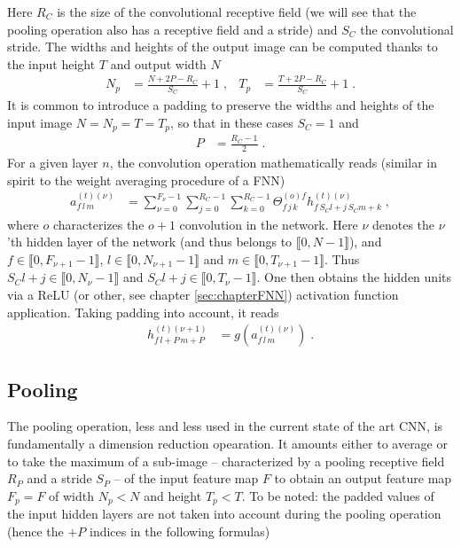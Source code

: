 Here $R_C$ is the size of the convolutional receptive field (we will see that the pooling operation also has a receptive field and a stride) and $S_C$ the convolutional stride. The widths and heights of the output image can be computed thanks to the input height $T$ and output width $N$
\begin{align}
N_p&=\frac{N+2P-R_C}{S_C}+1 \;,&
%
T_p&=\frac{T+2P-R_C}{S_C}+1\;.
\end{align}
It is common to introduce a padding to preserve the widths and heights of the input image $N=N_p=T=T_p$, so that in these cases $S_C=1$ and
\begin{align}
P&=\frac{R_C-1}{2}\;.
\end{align}
For a given layer $n$, the convolution operation mathematically reads (similar in spirit to the weight averaging procedure of a FNN)
\begin{align}
a_{f\,l\,m}^{(t)(\nu)}&=\sum^{F_\nu-1}_{\nu=0}\sum^{R_C-1}_{j=0}\sum^{R_C-1}_{k=0}
%
\Theta^{(o)f}_{f\,j\,k}h^{(t)(\nu)}_{f\,S_Cl+j\,S_Cm+k}\;,
\end{align}
where $o$ characterizes the $o+1$ convolution in the network. Here $\nu$ denotes the $\nu$'th hidden layer of the network (and thus belongs to $\llbracket0,N-1 \rrbracket$), and $f\in\llbracket0,F_{\nu+1}-1\rrbracket$, $l\in\llbracket0,N_{\nu+1}-1 \rrbracket$ and $m\in\llbracket0,T_{\nu+1}-1 \rrbracket$. Thus $S_Cl+j\in\llbracket0,N_\nu-1 \rrbracket$ and $S_Cl+j\in\llbracket0,T_\nu-1 \rrbracket$. One then obtains the hidden units via a ReLU (or other, see chapter \ref{sec:chapterFNN}) activation function application. Taking padding into account, it reads
\begin{align}
h_{f\,l+P\,m+P}^{(t)(\nu+1)}&=g\left(a_{f\,l\,m}^{(t)(\nu)}\right)\;.
\end{align} 


\subsection{Pooling}

The pooling operation, less and less used in the current state of the art CNN, is fundamentally a dimension reduction opearation. It amounts either to average or to take the maximum of a sub-image -- characterized by a pooling receptive field $R_P$ and a stride $S_P$ -- of the input feature map $F$ to obtain an output feature map $F_p=F$ of width $N_p<N$ and height $T_p<T$. To be noted: the padded values of the input hidden layers are not taken into account during the pooling operation (hence the $+P$ indices in the following formulas)


